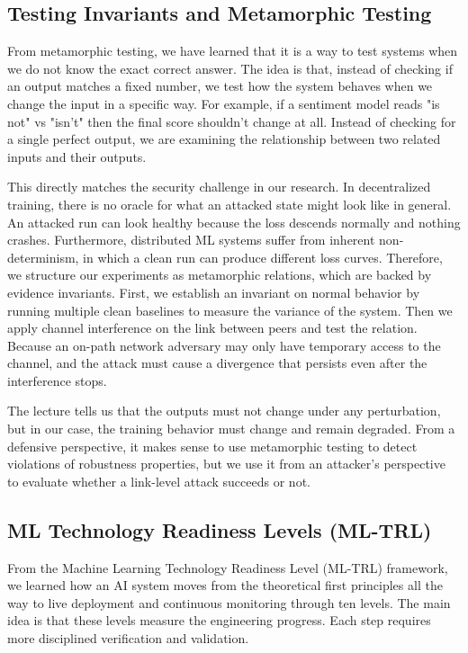 \documentclass[11pt,a4paper]{article}
\begin{document}
\subsection{Testing Invariants and Metamorphic Testing}

From metamorphic testing, we have learned that it is a way to test systems when we do not know the exact correct answer. The idea is that, instead of checking if an output matches a fixed number, we test how the system behaves when we change the input in a specific way. For example, if a sentiment model reads "is not" vs "isn't" then the final score shouldn't change at all. Instead of checking for a single perfect output, we are examining the relationship between two related inputs and their outputs.

This directly matches the security challenge in our research. In decentralized training, there is no oracle for what an attacked state might look like in general. An attacked run can look healthy because the loss descends normally and nothing crashes. Furthermore, distributed ML systems suffer from inherent non-determinism, in which a clean run can produce different loss curves. Therefore, we structure our experiments as metamorphic relations, which are backed by evidence invariants. First, we establish an invariant on normal behavior by running multiple clean baselines to measure the variance of the system. Then we apply channel interference on the link between peers and test the relation. Because an on-path network adversary may only have temporary access to the channel, and the attack must cause a divergence that persists even after the interference stops.

The lecture tells us that the outputs must not change under any perturbation, but in our case, the training behavior must change and remain degraded. From a defensive perspective, it makes sense to use metamorphic testing to detect violations of robustness properties, but we use it from an attacker's perspective to evaluate whether a link-level attack succeeds or not.

\subsection{ML Technology Readiness Levels (ML-TRL)}

From the Machine Learning Technology Readiness Level (ML-TRL) framework, we learned how an AI system moves from the theoretical first principles all the way to live deployment and continuous monitoring through ten levels. The main idea is that these levels measure the engineering progress. Each step requires more disciplined verification and validation.
\end{document}
